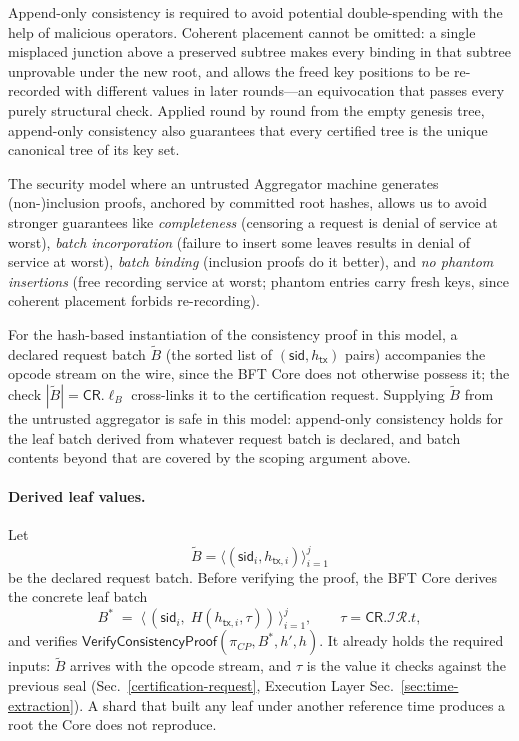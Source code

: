Append-only consistency is required to avoid potential double-spending with the help of malicious operators. Coherent placement cannot be omitted: a single misplaced junction above a preserved subtree makes every binding in that subtree unprovable under the new root, and allows the freed key positions to be re-recorded with different values in later rounds---an equivocation that passes every purely structural check. Applied round by round from the empty genesis tree, append-only consistency also guarantees that every certified tree is the unique canonical tree of its key set.

The security model where an untrusted Aggregator machine generates (non-)inclusion proofs, anchored by committed root hashes, allows us to avoid stronger guarantees like \emph{completeness} (censoring a request is denial of service at worst), \emph{batch incorporation} (failure to insert some leaves results in denial of service at worst), \emph{batch binding} (inclusion proofs do it better), and \emph{no phantom insertions} (free recording service at worst; phantom entries carry fresh keys, since coherent placement forbids re-recording).

For the hash-based instantiation of the consistency proof in this model, a declared request batch $\widetilde B$ (the sorted list of $(\mathsf{sid}, h_\mathsf{tx})$ pairs) accompanies the opcode stream on the wire, since the BFT Core does not otherwise possess it; the check $|\widetilde B| = \mathsf{CR}.\ell_B$ cross-links it to the certification request. Supplying $\widetilde B$ from the untrusted aggregator is safe in this model: append-only consistency holds for the leaf batch derived from whatever request batch is declared, and batch contents beyond that are covered by the scoping argument above.

\paragraph{Derived leaf values.}\label{sec:derived-leaf-values}
Let
\[
	\widetilde B = \bigl\langle (\mathsf{sid}_i,h_{\mathsf{tx},i}) \bigr\rangle_{i=1}^{j}
\]
be the declared request batch. Before verifying the proof, the BFT Core derives the concrete leaf batch
\[
	B^{*} \;=\; \bigl\langle\, (\mathsf{sid}_i,\; H(h_{\mathsf{tx},i},\tau)) \,\bigr\rangle_{i=1}^{j},
	\qquad \tau = \mathsf{CR}.\mathcal{IR}.t ,
\]
and verifies $\mathsf{VerifyConsistencyProof}(\pi_{CP}, B^{*}, h', h)$. It already holds the required inputs: $\widetilde B$ arrives with the opcode stream, and $\tau$ is the value it checks against the previous seal (Sec.~\ref{certification-request}, Execution Layer Sec.~\ref{sec:time-extraction}). A shard that built any leaf under another reference time produces a root the Core does not reproduce.

